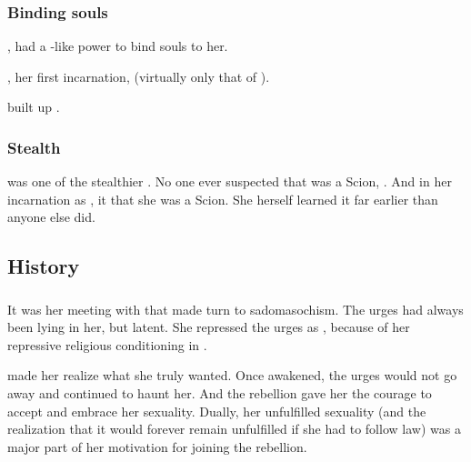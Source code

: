 \subsubsection{Binding souls}
\index{\carcer!\Shiaraid}
, \Shiaraid{} had a \sephirah-like power to bind souls to her. 

\Delphine{}, her first incarnation,  (virtually only that of \Eryal). 

\Belzir{} built up . 





\subsubsection{Stealth}
\Shiaraid{} was one of the stealthier \Malachim. 
No one ever suspected that \Delphine{} was a Scion, . 
And in her incarnation as \Belzir{}, it  that she was a Scion. 
She herself learned it far earlier than anyone else did. 








\subsection{History}





\subsubsection{\Semiza}
It was her meeting with \Semiza{} that made \Shiaraid{} turn to sadomasochism. 
The urges had always been lying in her, but latent.
She repressed the urges as , because of her repressive religious conditioning in \Merkyrah. 

\Semiza{} made her realize what she truly wanted. 
Once awakened, the urges would not go away and continued to haunt her. 
And the rebellion gave her the courage to accept and embrace her sexuality. 
Dually, her unfulfilled sexuality (and the realization that it would forever remain unfulfilled if she had to follow \Merkyran{} law) was a major part of her motivation for joining the rebellion. 

